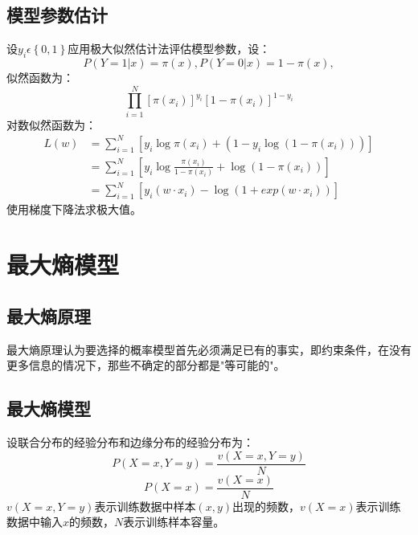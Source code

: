 \documentclass{article}
\begin{document}
	\subsection{模型参数估计}
	设$y_{i}\epsilon \left \{ 0,1 \right \}$应用极大似然估计法评估模型参数，设：
	\begin{equation}
	P\left ( Y=1|x \right )=\pi \left ( x \right ),P\left ( Y=0|x \right )=1-\pi \left ( x \right ),
	\end{equation}
	似然函数为：
	\begin{equation}
	 \prod_{i=1}^{N}\left [ \pi\left ( x_{i} \right ) \right ]^{y_{i}}\left [ 1-\pi\left ( x_{i} \right ) \right ]^{1-y_{i}} 
	\end{equation}
	对数似然函数为：
	\begin{align}
	L\left ( w \right ) &=\sum_{i=1}^{N}\left [ y_{i}\log \pi\left ( x_{i}\right )+\left ( 1-y_{i}\log \left ( 1-\pi\left ( x_{i} \right ) \right ) \right )  \right ]\\
	&=\sum_{i=1}^{N}\left [ y_{i}\log \frac{\pi\left ( x_{i} \right )}{1-\pi\left ( x_{i} \right )}+\log \left ( 1-\pi\left ( x_{i} \right ) \right ) \right ]\\
	&=\sum_{i=1}^{N}\left [ y_{i}\left ( w\cdot x_{i} \right )-\log \left ( 1+exp\left ( w\cdot x_{i} \right ) \right ) \right ]
	\end{align}
	使用梯度下降法求极大值。
	\section{最大熵模型}
	\subsection{最大熵原理}
	最大熵原理认为要选择的概率模型首先必须满足已有的事实，即约束条件，在没有更多信息的情况下，那些不确定的部分都是"等可能的"。
	\subsection{最大熵模型}
	设联合分布的经验分布和边缘分布的经验分布为：
	\begin{equation}
	P\left ( X=x,Y=y \right )=\frac{v\left ( X=x,Y=y \right )}{N}
	\end{equation}
	\begin{equation}
	P\left ( X=x \right )=\frac{v\left ( X=x \right )}{N}
	\end{equation}
	$v(X=x,Y=y)$表示训练数据中样本$(x,y)$出现的频数，$v(X=x)$表示训练数据中输入$x$的频数，$N$表示训练样本容量。\\
	
\end{document}
